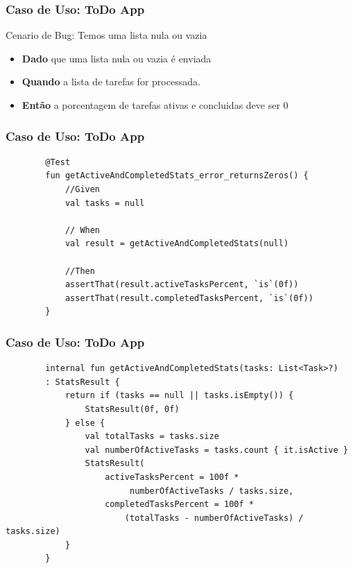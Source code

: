 \documentclass{beamer}
\begin{document}
\begin{frame}
	\frametitle{Caso de Uso: ToDo App}
	Cenario de Bug: Temos uma lista nula ou vazia
	\begin{itemize}
		\item \textbf{Dado} que uma lista nula ou vazia é enviada
		\item \textbf{Quando} a lista de tarefas for processada.
		\item \textbf{Então} a porcentagem de tarefas ativas e concluidas deve ser 0
	\end{itemize}
\end{frame}

\begin{frame}[fragile]
	\frametitle{Caso de Uso: ToDo App}
	\begin{example}
		\begin{lstlisting}
		@Test
		fun getActiveAndCompletedStats_error_returnsZeros() {
			//Given
			val tasks = null
		
			// When
			val result = getActiveAndCompletedStats(null)
		
			//Then
			assertThat(result.activeTasksPercent, `is`(0f))
			assertThat(result.completedTasksPercent, `is`(0f))
		}
		\end{lstlisting}
	\end{example}
\end{frame}

\begin{frame}[fragile]
	\frametitle{Caso de Uso: ToDo App}
	\begin{example}
		\begin{lstlisting}
		internal fun getActiveAndCompletedStats(tasks: List<Task>?)
		: StatsResult {
			return if (tasks == null || tasks.isEmpty()) {
				StatsResult(0f, 0f)
			} else {
				val totalTasks = tasks.size
				val numberOfActiveTasks = tasks.count { it.isActive }
				StatsResult(
					activeTasksPercent = 100f *
						 numberOfActiveTasks / tasks.size,
					completedTasksPercent = 100f * 
						(totalTasks - numberOfActiveTasks) / tasks.size)
			}
		}
		\end{lstlisting}
	\end{example}
\end{frame}
\end{document}

